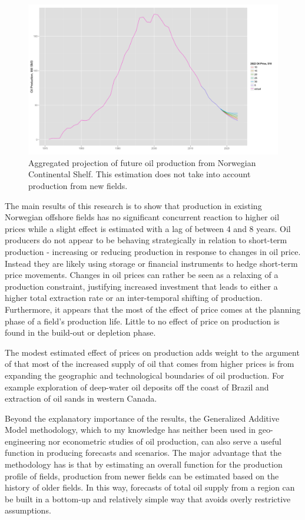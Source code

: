 \documentclass[12pt]{article}
\begin{document}
\begin{figure}
	\includegraphics[width=1\textwidth]{figures/tot_forecast_print.png}
	\caption{Aggregated projection of future oil production from Norwegian Continental Shelf.  This estimation does not take into account production from new fields.}
	\label{tot_forecast}
\end{figure}


The main results of this research is to show that production in existing Norwegian offshore fields has no significant concurrent reaction to higher oil prices while a slight effect is estimated  with a lag of between 4 and 8 years.  Oil producers do not appear to be behaving strategically in relation to short-term production - increasing or reducing production in response to changes in oil price.  Instead they are likely using storage or financial instruments to hedge short-term price movements. Changes in oil prices can rather be seen as a relaxing of a production constraint, justifying increased investment that leads to either a higher total extraction rate or an inter-temporal shifting of production. Furthermore, it appears that the most of the effect of price comes at the planning phase of a field's production life.  Little to no effect of price on production is found in the build-out or depletion phase.

The modest estimated effect of prices on production adds weight to the argument of \citet{hamilton_oil_2012} that most of the increased supply of oil that comes from higher prices is from expanding the geographic and technological boundaries of oil production.  For example exploration of deep-water oil deposits off the coast of Brazil and extraction of oil sands in western Canada. 

Beyond the explanatory importance of the results, the Generalized Additive Model methodology, which to my knowledge has neither been used in geo-engineering nor econometric studies of oil production, can also serve a useful function in producing forecasts and scenarios.  The major advantage that the methodology has is that by estimating an overall function for the production profile of fields, production from newer fields can be estimated based on the history of older fields.  In this way, forecasts of total oil supply from a region can be built in a bottom-up and relatively simple way that avoids overly restrictive assumptions. 
\end{document}
